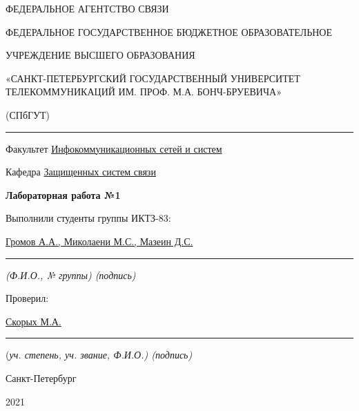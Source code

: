 \documentclass[a4paper,14pt]{extarticle}
\begin{document}
    \begin{center}
        \thispagestyle{empty}
        \begin{singlespace}
        ФЕДЕРАЛЬНОЕ АГЕНТСТВО СВЯЗИ

        ФЕДЕРАЛЬНОЕ ГОСУДАРСТВЕННОЕ БЮДЖЕТНОЕ ОБРАЗОВАТЕЛЬНОЕ

        УЧРЕЖДЕНИЕ ВЫСШЕГО ОБРАЗОВАНИЯ

        «САНКТ-ПЕТЕРБУРГСКИЙ ГОСУДАРСТВЕННЫЙ УНИВЕРСИТЕТ ТЕЛЕКОММУНИКАЦИЙ ИМ. ПРОФ. М.А. БОНЧ-БРУЕВИЧА»

        (СПбГУТ)
        \end{singlespace}
        \vspace{-1ex}
        \rule{\textwidth}{0.4pt}
        \vspace{-5ex}

        Факультет \underline{Инфокоммуникационных сетей и систем}

        Кафедра \underline{Защищенных систем связи}
        \vspace{10ex}

        \textbf{Лабораторная работа №1}\\
        


    \end{center}
    \vspace{4ex}
    \begin{flushright}
    \parbox{10 cm}{
    \begin{flushleft}
        Выполнили студенты группы ИКТЗ-83:

        \underline{Громов А.А., Миколаени М.С., Мазеин Д.С.} \hfill \rule[-0.85ex]{0.1\textwidth}{0.6pt}

        \footnotesize \textit{ (Ф.И.О., № группы) \hfill (подпись)} \normalsize

        Проверил:

        \underline{Скорых М.А.} \hfill \rule[-0.85ex]{0.1\textwidth}{0.6pt}

        (\footnotesize \textit{уч. степень, уч. звание, Ф.И.О.) \hfill (подпись)} \normalsize

    \end{flushleft}
    }
    \end{flushright}
    \begin{center}
        \vfill
        Санкт-Петербург

        2021

    \end{center}
    \newpage
\end{document}
